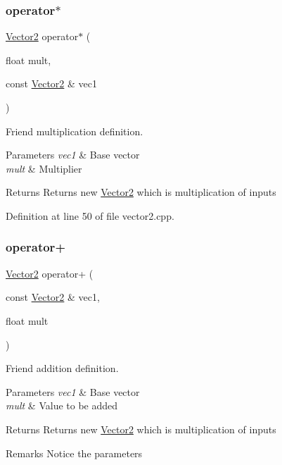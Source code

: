 \subsubsection{\texorpdfstring{operator$\ast$}{operator*}}
{\footnotesize\ttfamily \mbox{\hyperlink{classVector2}{Vector2}} operator$\ast$ (\begin{DoxyParamCaption}\item[{float}]{mult,  }\item[{const \mbox{\hyperlink{classVector2}{Vector2}} \&}]{vec1 }\end{DoxyParamCaption})\hspace{0.3cm}{\ttfamily [friend]}}



Friend multiplication definition. 


\begin{DoxyParams}{Parameters}
{\em vec1} & Base vector \\
\hline
{\em mult} & Multiplier \\
\hline
\end{DoxyParams}
\begin{DoxyReturn}{Returns}
Returns new \mbox{\hyperlink{classVector2}{Vector2}} which is multiplication of inputs 
\end{DoxyReturn}


Definition at line 50 of file vector2.\+cpp.

\mbox{\label{classVector2_a1ce2215611e761b7b1ca2f9f0dcdeb12}} 
\subsubsection{\texorpdfstring{operator+}{operator+}\hspace{0.1cm}{\footnotesize\ttfamily [1/2]}}
{\footnotesize\ttfamily \mbox{\hyperlink{classVector2}{Vector2}} operator+ (\begin{DoxyParamCaption}\item[{const \mbox{\hyperlink{classVector2}{Vector2}} \&}]{vec1,  }\item[{float}]{mult }\end{DoxyParamCaption})\hspace{0.3cm}{\ttfamily [friend]}}



Friend addition definition. 


\begin{DoxyParams}{Parameters}
{\em vec1} & Base vector \\
\hline
{\em mult} & Value to be added \\
\hline
\end{DoxyParams}
\begin{DoxyReturn}{Returns}
Returns new \mbox{\hyperlink{classVector2}{Vector2}} which is multiplication of inputs 
\end{DoxyReturn}
\begin{DoxyRemark}{Remarks}
Notice the parameters 
\end{DoxyRemark}


